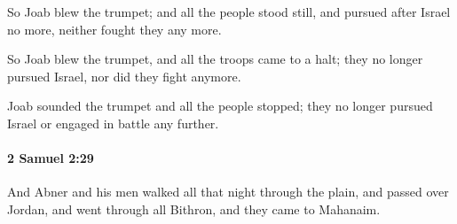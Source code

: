 			\begin{versebox}
					\item[BHS] 
					\item[ASV] So Joab blew the trumpet; and all the people stood still, and pursued after Israel no more, neither fought they any more.
					\item[NIV] So Joab blew the trumpet, and all the troops came to a halt; they no longer pursued Israel, nor did they fight anymore.
					\item[NRSV] Joab sounded the trumpet and all the people stopped; they no longer pursued Israel or engaged in battle any further.
			\end{versebox}

		\paragraph{2 Samuel 2:29} %
			\label{2SAMUEL-2-29}

			And Abner and his men walked all that night through the plain, and passed over Jordan, and went through all Bithron, and they came to Mahanaim.

